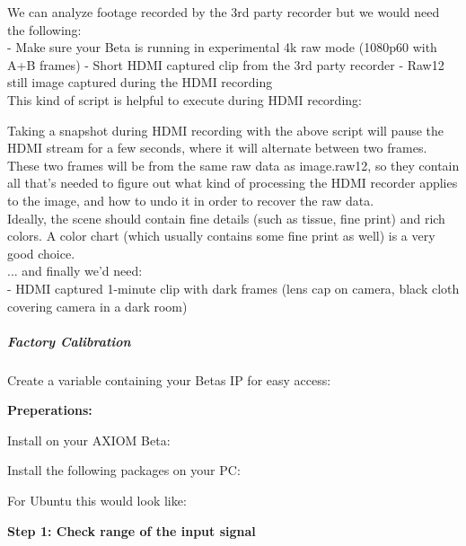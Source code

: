 We can analyze footage recorded by the 3rd party recorder but we would need the following:\\
	
- Make sure your Beta is running in experimental 4k raw mode (1080p60 with A+B frames)
- Short HDMI captured clip from the 3rd party recorder
- Raw12 still image captured during the HDMI recording\\
	
This kind of script is helpful to execute during HDMI recording: 
	

Taking a snapshot during HDMI recording with the above script will pause the HDMI stream for a few seconds, where it will alternate between two frames. These two frames will be from the same raw data as image.raw12, so they contain all that's needed to figure out what kind of processing the HDMI recorder applies to the image, and how to undo it in order to recover the raw data.\\
	
Ideally, the scene should contain fine details (such as tissue, fine print) and rich colors. A color chart (which usually contains some fine print as well) is a very good choice. \\
	
... and finally we'd need:\\
	
- HDMI captured 1-minute clip with dark frames (lens cap on camera, black cloth covering camera in a dark room)
	
	
	
\subparagraph{Factory Calibration}
	
Create a variable containing your Betas IP for easy access:
	
\textbf{Preperations:}
	
Install on your AXIOM Beta: 
	
	
Install the following packages on your PC: 
	
	
For Ubuntu this would look like: 
	
	
\textbf{Step 1: Check range of the input signal}
	
